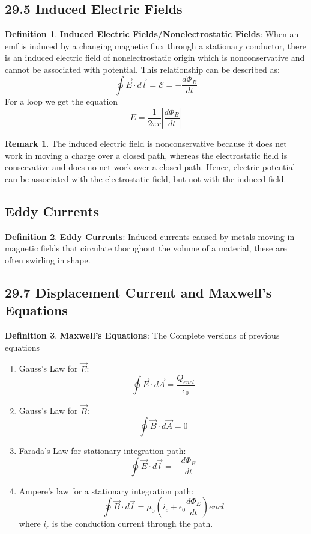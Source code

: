 \documentclass[12pt]{amsart}
\theoremstyle{definition}
\newtheorem{definition}{Definition} %
\newtheorem*{remark}{Remark}        %
\numberwithin{equation}{theorem}    %
\begin{document}
\subsection*{29.5 Induced Electric Fields}
\begin{definition}
    \textbf{Induced Electric Fields/Nonelectrostatic Fields}:
    When an emf is induced by a changing magnetic flux through a stationary conductor, there is an induced electric field of nonelectrostatic origin which is nonconservative and cannot be associated with potential. This relationship can be described as: 
    $$\oint \vec{E} \cdot d\vec{l} = \mathcal{E} = -\frac{d\Phi_B}{dt}$$
    For a loop we get the equation $$E = \frac{1}{2\pi r}{|\frac{d\Phi_B}{dt}|}$$

    \begin{remark}
        The induced electric field is nonconservative because it does net work in moving a charge over a closed path, whereas the electrostatic field is conservative and does no net work over a closed path. Hence, electric potential can be associated with the electrostatic field, but not with the induced field.
    \end{remark}
\end{definition}

\subsection*{Eddy Currents}

\begin{definition}
    \textbf{Eddy Currents}:
    Induced currents caused by metals moving in magnetic fields that circulate thorughout the volume of a material, these are often swirling in shape. 
\end{definition}

\subsection*{29.7 Displacement Current and Maxwell's Equations}

\begin{definition}
    \textbf{Maxwell's Equations}:
    The Complete versions of previous equations
    \begin{enumerate}
        \item Gauss's Law for $\vec{E}$: $$\oint \vec{E} \cdot d\vec{A} = \frac{Q_{encl}}{\epsilon_0}$$ 
        \item Gauss's Law for $\vec{B}$: $$\oint \vec{B} \cdot d\vec{A} = 0$$
        \item Farada's Law for stationary integration path:$$\oint \vec{E} \cdot d\vec{l} = -\frac{d\Phi_B}{dt}$$  
        \item Ampere’s law for a stationary integration path:
        $$\oint \vec{B} \cdot d\vec{l} = \mu_0 (i_c + \epsilon_0\frac{d\Phi_E}{dt})encl$$ where $i_c$ is the conduction current through the path.
    \end{enumerate}
\end{definition}
\end{document}
